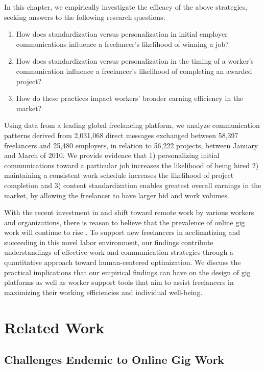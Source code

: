 In this chapter, we empirically investigate the efficacy of the above strategies, seeking answers to the following research questions: 

\begin{enumerate}
    \item How does standardization versus personalization in initial employer communications influence a freelancer's likelihood of winning a job?
    \item How does standardization versus personalization in the timing of a worker's communication influence a freelancer's likelihood of completing an awarded project?
    \item How do these practices impact workers' broader earning efficiency in the market?
\end{enumerate}

Using data from a leading global freelancing platform, we analyze communication patterns derived from 2,031,068 direct messages exchanged between 58,397 freelancers and 25,480 employers, in relation to 56,222 projects, between January and March of 2010. We provide evidence that 1) personalizing initial communications toward a particular job increases the likelihood of being hired 2) maintaining a consistent work schedule increases the likelihood of project completion and 3) {content} standardization enables greatest overall earnings in the market, by allowing the freelancer to have larger bid and work volumes.

With the recent investment in and shift toward remote work by various workers and organizations, there is reason to believe that the prevalence of online gig work will continue to rise \cite{Barrero2020-sf, huang2020unemployment}. To support new freelancers in acclimatizing and succeeding in this {novel} labor environment, our findings contribute understandings of effective work and communication strategies through a quantitative approach toward human-centered optimization.
We discuss the practical implications that our empirical findings can have on the design of gig platforms {as well as} worker support tools that aim to assist freelancers in maximizing their working efficiencies and individual well-being.

\section{Related Work}

\subsection{{Challenges Endemic to Online Gig Work}}

